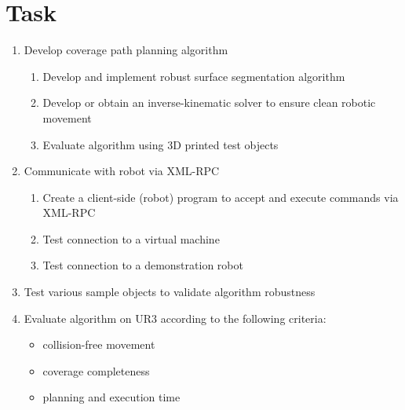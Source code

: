 \documentclass[a4paper, 10pt]{article}
\begin{document}
\section*{Task}
\begin{enumerate}
	\item Develop coverage path planning algorithm
	\begin{enumerate}
		\item Develop and implement robust surface segmentation algorithm
		\item Develop or obtain an inverse-kinematic solver to ensure clean robotic movement
		\item Evaluate algorithm using 3D printed test objects
	\end{enumerate}
	\item Communicate with robot via XML-RPC
	\begin{enumerate}
		\item Create a client-side (robot) program to accept and execute commands via XML-RPC
		\item Test connection to a virtual machine
		\item Test connection to a demonstration robot
	\end{enumerate}
	\item Test various sample objects to validate algorithm robustness
	\item Evaluate algorithm on UR3 according to the following criteria:
		\begin{itemize}
			\item collision-free movement
			\item coverage completeness
			\item planning and execution time
		\end{itemize}
\end{enumerate}

\printbibliography
\end{document}
